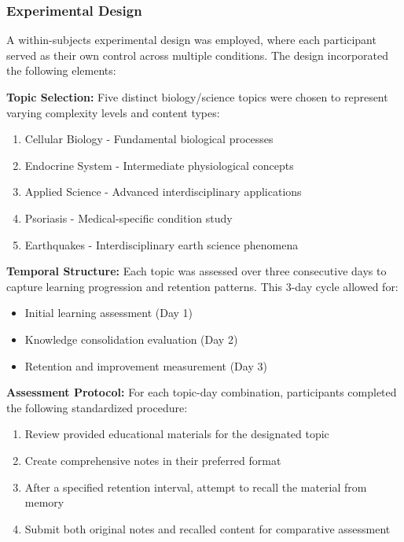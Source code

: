 \subsubsection{Experimental Design}

A within-subjects experimental design was employed, where each participant served as their own control across multiple conditions. The design incorporated the following elements:

\textbf{Topic Selection:} Five distinct biology/science topics were chosen to represent varying complexity levels and content types:
\begin{enumerate}
    \item Cellular Biology - Fundamental biological processes
    \item Endocrine System - Intermediate physiological concepts  
    \item Applied Science - Advanced interdisciplinary applications
    \item Psoriasis - Medical-specific condition study
    \item Earthquakes - Interdisciplinary earth science phenomena
\end{enumerate}

\textbf{Temporal Structure:} Each topic was assessed over three consecutive days to capture learning progression and retention patterns. This 3-day cycle allowed for:
\begin{itemize}
    \item Initial learning assessment (Day 1)
    \item Knowledge consolidation evaluation (Day 2)
    \item Retention and improvement measurement (Day 3)
\end{itemize}

\textbf{Assessment Protocol:} For each topic-day combination, participants completed the following standardized procedure:
\begin{enumerate}
    \item Review provided educational materials for the designated topic
    \item Create comprehensive notes in their preferred format
    \item After a specified retention interval, attempt to recall the material from memory
    \item Submit both original notes and recalled content for comparative assessment
\end{enumerate}

